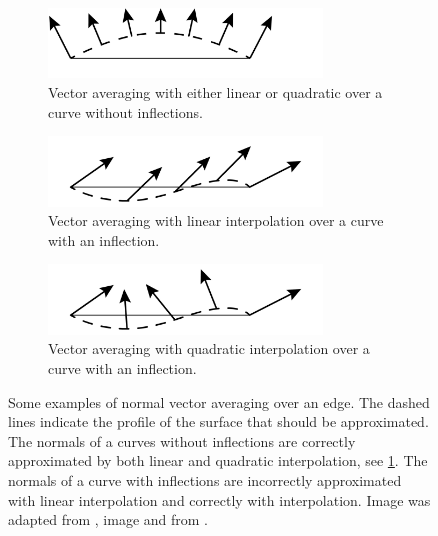 	\begin{figure}
		\centering
		\begin{subfigure}{\columnwidth}
			\centering
			\includegraphics[width=0.8\textwidth]{./content/img/method/linearVsQuadraticNormals_both.png}
			\caption{Vector averaging with either linear or quadratic over a curve without inflections.}
			\label{fig:method:normal:both}
		\end{subfigure}
		\begin{subfigure}{\columnwidth}
			\centering
			\includegraphics[width=0.8\textwidth]{./content/img/method/linearVsQuadraticNormals_linear}
			\caption{Vector averaging with linear interpolation over a curve with an inflection.}
			\label{fig:method:normal:linear}
		\end{subfigure}	
		\begin{subfigure}{\columnwidth}
			\centering
			\includegraphics[width=0.8\textwidth]{./content/img/method/linearVsQuadraticNormals_quadratic}
			\caption{Vector averaging with quadratic interpolation over a curve with an inflection.}
			\label{fig:method:normal:quadratic}
		\end{subfigure}			
		\caption{Some examples of normal vector averaging over an edge. The dashed lines indicate the profile of the surface that should be approximated. The normals of a curves without inflections are correctly approximated by both linear and quadratic interpolation, see \cref{fig:method:normal:both}. The normals of a curve with inflections are incorrectly approximated with  linear interpolation and correctly with  interpolation. Image  was adapted from \cite{van1997phong}, image  and  from \cite{vlachos2001curved}.}
		\label{fig:method:normal}
	\end{figure}

